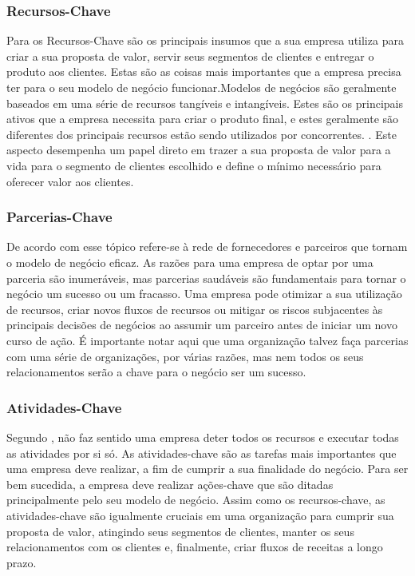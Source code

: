 \subsubsection{Recursos-Chave}
\label{cha:recursos_chave}
Para  os Recursos-Chave são os principais insumos que a sua empresa utiliza para criar a sua proposta de valor, servir seus segmentos de clientes e entregar o produto aos clientes. Estas são as coisas mais importantes que a empresa precisa ter para o seu modelo de negócio funcionar.Modelos de negócios são geralmente baseados em uma série de recursos tangíveis e intangíveis. Estes são os principais ativos que a empresa necessita para criar o produto final, e estes geralmente são diferentes dos principais recursos estão sendo utilizados por concorrentes. . Este aspecto desempenha um papel direto em trazer a sua proposta de valor para a vida para o segmento de clientes escolhido e define o mínimo necessário para oferecer valor aos clientes.

\subsubsection{Parcerias-Chave}
\label{cha:parcerias_chave}
De acordo com  esse tópico refere-se à rede de fornecedores e parceiros que
tornam o modelo de negócio eficaz. As razões para uma empresa de optar por uma parceria são inumeráveis, mas parcerias saudáveis são fundamentais para tornar o negócio um sucesso ou um
fracasso. Uma empresa pode otimizar a sua utilização de recursos, criar novos fluxos de recursos ou
mitigar os riscos subjacentes às principais decisões de negócios ao assumir um parceiro antes de
iniciar um novo curso de ação. É importante notar aqui que uma organização talvez faça parcerias com
uma série de organizações, por várias razões, mas nem todos os seus relacionamentos serão a chave
para o negócio ser um sucesso.

\subsubsection{Atividades-Chave}
\label{cha:atividades_chave}
Segundo , não faz sentido uma empresa deter todos os recursos e executar todas as atividades por si só. As atividades-chave são as tarefas mais importantes que uma empresa deve realizar, a fim de cumprir a sua finalidade do negócio. Para ser bem sucedida, a empresa deve realizar ações-chave que são ditadas principalmente pelo seu modelo de negócio. Assim como os recursos-chave, as atividades-chave são igualmente cruciais em uma organização para cumprir sua proposta de valor, atingindo seus segmentos de clientes, manter os seus relacionamentos com os clientes e, finalmente, criar fluxos de receitas a longo prazo.

